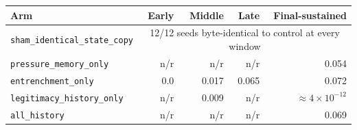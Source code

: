 \begin{tabular}{@{}lrrrr@{}}
\toprule
\textbf{Arm} & \textbf{Early} & \textbf{Middle} & \textbf{Late} & \textbf{Final-sustained} \\
\midrule
\texttt{sham\_identical\_state\_copy} & \multicolumn{4}{c}{12/12 seeds byte-identical to control at every window} \\
\texttt{pressure\_memory\_only} & n/r & n/r & n/r & 0.054 \\
\texttt{entrenchment\_only} & 0.0 & 0.017 & 0.065 & 0.072 \\
\texttt{legitimacy\_history\_only} & n/r & 0.009 & n/r & $\approx4\times10^{-12}$ \\
\texttt{all\_history} & n/r & n/r & n/r & 0.069 \\
\bottomrule
\end{tabular}
